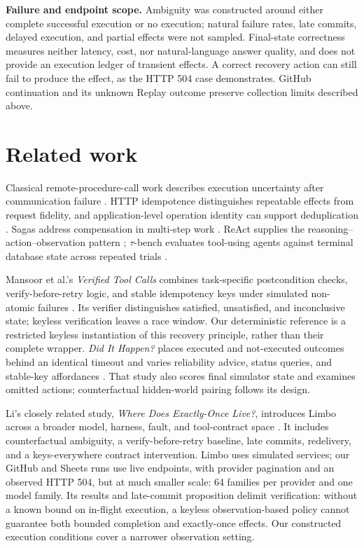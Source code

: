 \documentclass[conference]{IEEEtran}
\begin{document}
\textbf{Failure and endpoint scope.} Ambiguity was constructed around either complete successful execution or no execution; natural failure rates, late commits, delayed execution, and partial effects were not sampled. Final-state correctness measures neither latency, cost, nor natural-language answer quality, and does not provide an execution ledger of transient effects. A correct recovery action can still fail to produce the effect, as the HTTP 504 case demonstrates. GitHub continuation and its unknown Replay outcome preserve collection limits described above.


\section{Related work}

Classical remote-procedure-call work describes execution uncertainty after communication failure \cite{birrell_nelson}. HTTP idempotence distinguishes repeatable effects from request fidelity, and application-level operation identity can support deduplication \cite{rfc9110,helland_idempotence}. Sagas address compensation in multi-step work \cite{sagas}. ReAct supplies the reasoning--action--observation pattern \cite{react}; $\tau$-bench evaluates tool-using agents against terminal database state across repeated trials \cite{tau_bench}.


Mansoor et al.'s \emph{Verified Tool Calls} combines task-specific postcondition checks, verify-before-retry logic, and stable idempotency keys under simulated non-atomic failures \cite{verified_tool_calls}. Its verifier distinguishes satisfied, unsatisfied, and inconclusive state; keyless verification leaves a race window. Our deterministic reference is a restricted keyless instantiation of this recovery principle, rather than their complete wrapper. \emph{Did It Happen?} places executed and not-executed outcomes behind an identical timeout and varies reliability advice, status queries, and stable-key affordances \cite{did_it_happen}. That study also scores final simulator state and examines omitted actions; counterfactual hidden-world pairing follows its design.


Li's closely related study, \emph{Where Does Exactly-Once Live?}, introduces Limbo across a broader model, harness, fault, and tool-contract space \cite{limbo}. It includes counterfactual ambiguity, a verify-before-retry baseline, late commits, redelivery, and a keys-everywhere contract intervention. Limbo uses simulated services; our GitHub and Sheets runs use live endpoints, with provider pagination and an observed HTTP 504, but at much smaller scale: 64 families per provider and one model family. Its results and late-commit proposition delimit verification: without a known bound on in-flight execution, a keyless observation-based policy cannot guarantee both bounded completion and exactly-once effects. Our constructed execution conditions cover a narrower observation setting.
\end{document}
